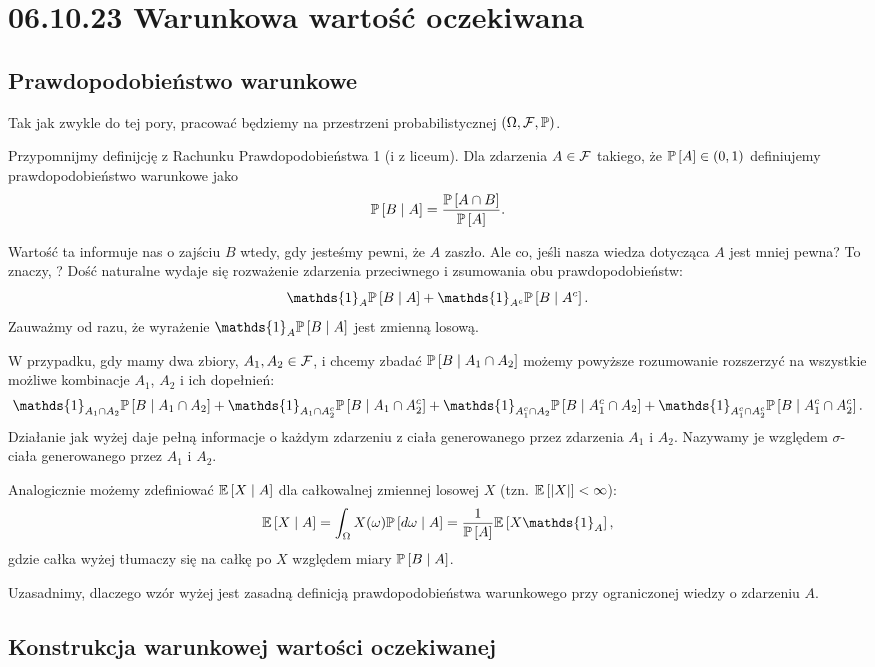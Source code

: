 \section{06.10.23 Warunkowa wartość oczekiwana}

\subsection{Prawdopodobieństwo warunkowe}

Tak jak zwykle do tej pory, pracować będziemy na przestrzeni probabilistycznej $(\Omega,\set{F},\prob)$.

Przypomnijmy definijcję  z Rachunku Prawdopodobieństwa 1 (i z liceum). Dla zdarzenia $A\in\mathcal{F}$ takiego, że $\prob{A}\in(0, 1)$ definiujemy prawdopodobieństwo warunkowe jako
$$\prob{B\;|\;A}=\frac{\prob{A\cap B}}{\prob{A}}.$$

Wartość ta informuje nas o zajściu $B$ wtedy, gdy jesteśmy pewni, że $A$ zaszło. Ale co, jeśli nasza wiedza dotycząca $A$ jest mniej pewna? To znaczy, ? Dość naturalne wydaje się rozważenie zdarzenia przeciwnego i zsumowania obu prawdopodobieństw:
$$\mathds{1}_A\prob{B\;|\;A}+\mathds{1}_{A^c}\prob{B\;|\;A^c}.$$
Zauważmy od razu, że wyrażenie $\mathds{1}_A\prob{B\;|\;A}$ jest zmienną losową.

W przypadku, gdy mamy dwa zbiory, $A_1,A_2\in\mathcal{F}$, i chcemy zbadać $\prob{B\;|\;A_1\cap A_2}$ możemy powyższe rozumowanie rozszerzyć na wszystkie możliwe kombinacje $A_1$, $A_2$ i ich dopełnień:
$$\mathds{1}_{A_1\cap A_2}\prob{B\;|\;A_1\cap A_2}+\mathds{1}_{A_1\cap A_2^c}\prob{B\;|\;A_1\cap A_2^c}+\mathds{1}_{A_1^c\cap A_2}\prob{B\;|\;A_1^c\cap A_2}+\mathds{1}_{A_1^c\cap A_2^c}\prob{B\;|\;A_1^c\cap A_2^c}.$$
Działanie jak wyżej daje pełną informacje o każdym zdarzeniu z ciała generowanego przez zdarzenia $A_1$ i $A_2$. Nazywamy je  względem $\sigma$-ciała generowanego przez $A_1$ i $A_2$.

Analogicznie możemy zdefiniować $\expected{X\;|\;A}$ dla całkowalnej zmiennej losowej $X$ (tzn. $\expected{|X|}<\infty$):
$$\expected{X\;|\;A}=\int_\Omega X(\omega)\prob{d\omega\;|\;A}=\frac{1}{\prob{A}}\expected{X\mathds{1}_A},$$
gdzie całka wyżej tłumaczy się na całkę po $X$ względem miary $\prob{B\;|\;A}$. 

Uzasadnimy, dlaczego wzór wyżej jest zasadną definicją prawdopodobieństwa warunkowego przy ograniczonej wiedzy o zdarzeniu $A$.

\subsection{Konstrukcja warunkowej wartości oczekiwanej}

